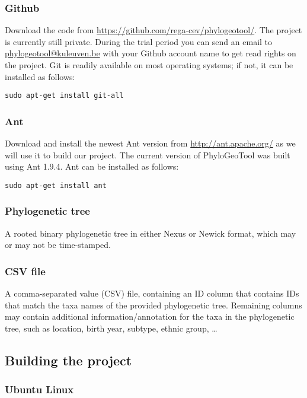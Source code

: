 \documentclass[a4paper, 11pt]{article} %
\begin{document}
\subsubsection*{Github}
Download the code from \url{https://github.com/rega-cev/phylogeotool/}. 
The project is currently still private. 
During the trial period you can send an email to \href{mailto:phylogeotool@kuleuven.be}  {phylogeotool@kuleuven.be} with your Github account name to get read rights on the project.
Git is readily available on most operating systems; if not, it can be installed as follows:
\begin{verbatim}
sudo apt-get install git-all
\end{verbatim}

\subsubsection*{Ant}
Download and install the newest Ant version from \url{http://ant.apache.org/} as we will use it to build our project.
The current version of PhyloGeoTool was built using Ant 1.9.4.
Ant can be installed as follows:
\begin{verbatim}
sudo apt-get install ant
\end{verbatim}

\subsubsection*{Phylogenetic tree}
A rooted binary phylogenetic tree in either Nexus or Newick format, which may or may not be time-stamped.

\subsubsection*{CSV file}
A comma-separated value (CSV) file, containing an ID column that contains IDs that match the taxa names of the provided phylogenetic tree.
Remaining columns may contain additional information/annotation for the taxa in the phylogenetic tree, such as location, birth year, subtype, ethnic group, \ldots

\subsection{Building the project}

\subsubsection{Ubuntu Linux}
\end{document}
